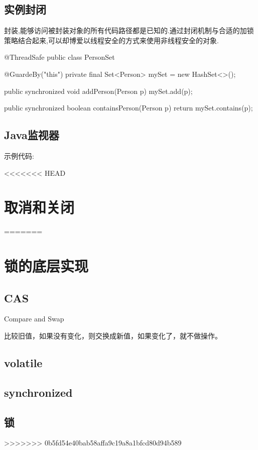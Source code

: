 \subsection{实例封闭}

封装,能够访问被封装对象的所有代码路径都是已知的.通过封闭机制与合适的加锁策略结合起来,可以却博爱以线程安全的方式来使用非线程安全的对象.

\begin{Java}
@ThreadSafe
public class PersonSet {

	@GuardeBy("this")
	private final Set<Person> mySet = new HashSet<>();
	
	public synchronized void addPerson(Person p)
	{
		mySet.add(p);
	}
	
	public synchronized boolean containsPerson(Person p)
	{
		return mySet.contains(p);
	}
}
\end{Java}


\subsection{Java监视器}


示例代码:


\begin{Java}



\end{Java}



<<<<<<< HEAD
\section{取消和关闭}

\begin{Java}




\end{Java}
=======
\section{锁的底层实现}

\subsection{CAS}

Compare and Swap

比较旧值，如果没有变化，则交换成新值，如果变化了，就不做操作。

\subsection{volatile}

\subsection{synchronized}

\subsection{锁}
>>>>>>> 0b5fd54e40bab58affa9c19a8a1bfcd80d94b589











